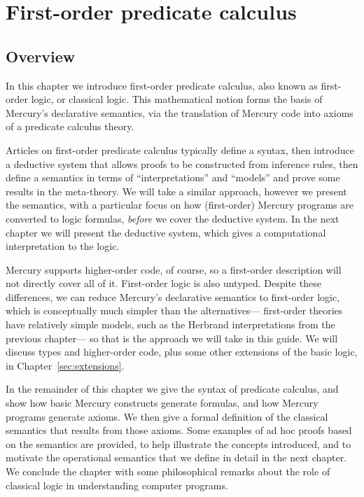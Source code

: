 \chapter{First-order predicate calculus}
\label{sec:fopc}

\section{Overview}

In this chapter we introduce first-order predicate calculus,
also known as first-order logic, or classical logic.
This mathematical notion
forms the basis of Mercury's declarative semantics,
via the translation of Mercury code
into axioms of a predicate calculus theory.

Articles on first-order predicate calculus
typically define a syntax,
then introduce a deductive system that allows proofs to be constructed
from inference rules,
then define a semantics in terms of ``interpretations'' and ``models''
and prove some results in the meta-theory.
We will take a similar approach,
however we present the semantics,
with a particular focus on how (first-order) Mercury programs
are converted to logic formulas,
\emph{before} we cover the deductive system.
In the next chapter we will present the deductive system,
which gives a computational interpretation to the logic.

Mercury supports higher-order code, of course,
so a first-order description will not directly cover all of it.
First-order logic is also untyped.
Despite these differences,
we can reduce Mercury's declarative semantics to first-order logic,
which is conceptually much simpler than the alternatives---%
first-order theories have relatively simple models,
such as the Herbrand interpretations from the previous chapter---%
so that is the approach we will take in this guide.
We will discuss types and higher-order code,
plus some other extensions of the basic logic,
in Chapter~\ref{sec:extensions}.

In the remainder of this chapter
we give the syntax of predicate calculus,
and show how basic Mercury constructs generate formulas,
and how Mercury programs generate axioms.
We then give a formal definition of the classical semantics
that results from those axioms.
Some examples of ad hoc proofs based on the semantics are provided,
to help illustrate the concepts introduced,
and to motivate the operational semantics
that we define in detail in the next chapter.
We conclude the chapter with some philosophical remarks about
the role of classical logic in understanding computer programs.


